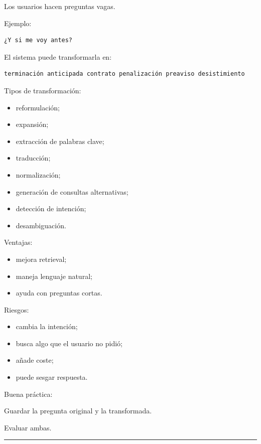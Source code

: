 Los usuarios hacen preguntas vagas.

Ejemplo:

\begin{lstlisting}
¿Y si me voy antes?
\end{lstlisting}

El sistema puede transformarla en:

\begin{lstlisting}
terminación anticipada contrato penalización preaviso desistimiento
\end{lstlisting}

Tipos de transformación:

\begin{itemize}
\tightlist
\item
  reformulación;
\item
  expansión;
\item
  extracción de palabras clave;
\item
  traducción;
\item
  normalización;
\item
  generación de consultas alternativas;
\item
  detección de intención;
\item
  desambiguación.
\end{itemize}

Ventajas:

\begin{itemize}
\tightlist
\item
  mejora retrieval;
\item
  maneja lenguaje natural;
\item
  ayuda con preguntas cortas.
\end{itemize}

Riesgos:

\begin{itemize}
\tightlist
\item
  cambia la intención;
\item
  busca algo que el usuario no pidió;
\item
  añade coste;
\item
  puede sesgar respuesta.
\end{itemize}

Buena práctica:

Guardar la pregunta original y la transformada.

Evaluar ambas.

\begin{center}\rule{0.5\linewidth}{0.5pt}\end{center}

